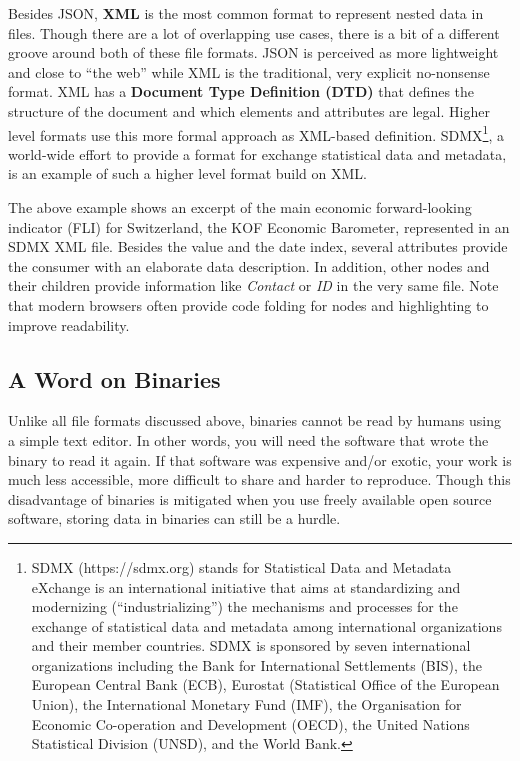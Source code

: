 \documentclass[
  12pt,
  letterpaper,
]{krantz}
\begin{document}
Besides JSON, \textbf{XML} is the most common format to represent nested
data in files. Though there are a lot of overlapping use cases, there is
a bit of a different groove around both of these file formats. JSON is
perceived as more lightweight and close to ``the web'' while XML is the
traditional, very explicit no-nonsense format. XML has a
\textbf{Document Type Definition (DTD)} that defines the structure of
the document and which elements and attributes are legal. Higher level
formats use this more formal approach as XML-based definition.
SDMX\footnote{SDMX (https://sdmx.org) stands for Statistical
  Data and Metadata eXchange is an international initiative that aims at
  standardizing and modernizing (``industrializing'') the mechanisms and
  processes for the exchange of statistical data and metadata among
  international organizations and their member countries. SDMX is
  sponsored by seven international organizations including the Bank for
  International Settlements (BIS), the European Central Bank (ECB),
  Eurostat (Statistical Office of the European Union), the International
  Monetary Fund (IMF), the Organisation for Economic Co-operation and
  Development (OECD), the United Nations Statistical Division (UNSD),
  and the World Bank.}, a world-wide effort to provide a format for
exchange statistical data and metadata, is an example of such a higher
level format build on XML.

The above example shows an excerpt of the main economic forward-looking
indicator (FLI) for Switzerland, the KOF Economic Barometer, represented
in an SDMX XML file. Besides the value and the
date index, several attributes provide the consumer with an elaborate
data description. In addition, other nodes and their children provide
information like \emph{Contact} or \emph{ID} in the very same file. Note
that modern browsers often provide code folding for nodes and
highlighting to improve readability.

\hypertarget{a-word-on-binaries}{%
\subsection{A Word on Binaries}\label{a-word-on-binaries}}

Unlike all file formats discussed above, binaries cannot be read by
humans using a simple text editor. In other words, you will need the
software that wrote the binary to read it again. If that software was
expensive and/or exotic, your work is much less accessible, more
difficult to share and harder to reproduce. Though this disadvantage of
binaries is mitigated when you use freely available open source
software, storing data in binaries can still be a hurdle.
\end{document}
